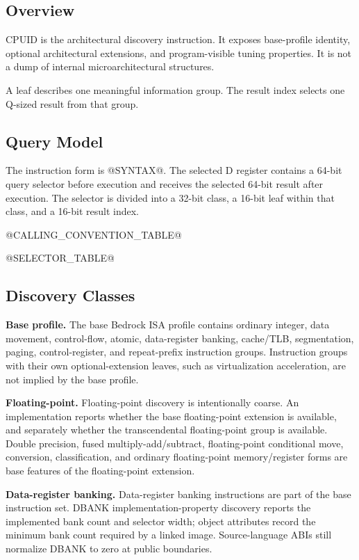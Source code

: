 \subsection{Overview}
CPUID is the architectural discovery instruction. It exposes base-profile identity, optional
architectural extensions, and program-visible tuning properties. It is not a dump of internal
microarchitectural structures.

A leaf describes one meaningful information group. The result index selects one Q-sized result
from that group.

\subsection{Query Model}
The instruction form is @SYNTAX@. The selected D register contains a 64-bit query selector
before execution and receives the selected 64-bit result after execution. The selector is divided into
a 32-bit class, a 16-bit leaf within that class, and a 16-bit result index.

@CALLING_CONVENTION_TABLE@

@SELECTOR_TABLE@

\subsection{Discovery Classes}
\noindent\textbf{Base profile.} The base Bedrock ISA profile contains ordinary integer, data movement,
control-flow, atomic, data-register banking, cache/TLB, segmentation, paging, control-register, and
repeat-prefix instruction groups. Instruction groups with their own optional-extension leaves, such as
virtualization acceleration, are not implied by the base profile.

\noindent\textbf{Floating-point.} Floating-point discovery is intentionally coarse. An implementation reports
whether the base floating-point extension is available, and separately whether the transcendental
floating-point group is available. Double precision, fused multiply-add/subtract, floating-point
conditional move, conversion, classification, and ordinary floating-point memory/register forms are base
features of the floating-point extension.

\noindent\textbf{Data-register banking.} Data-register banking instructions are part of the base instruction set.
DBANK implementation-property discovery reports the implemented bank count and selector width; object
attributes record the minimum bank count required by a linked image. Source-language ABIs still normalize
DBANK to zero at public boundaries.

